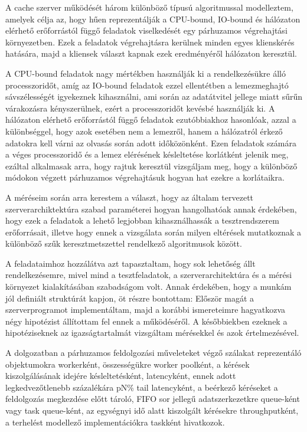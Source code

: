 \documentclass[11pt,a4paper]{article}
\begin{document}
A cache szerver működését három különböző típusú algoritmussal modelleztem, amelyek célja az, hogy hűen reprezentálják
a CPU-bound, IO-bound és hálózaton elérhető erőforrástól függő feladatok viselkedését egy párhuzamos végrehajtási környezetben.
Ezek a feladatok végrehajtásra kerülnek minden egyes klienskérés hatására, majd a kliensek választ kapnak ezek eredményéről
hálózaton keresztül.

A CPU-bound feladatok nagy mértékben használják ki a rendelkezésükre álló processzoridőt, amíg az IO-bound feladatok ezzel ellentétben
a lemezmeghajtó sávszélességét igyekeznek kihasználni, ami során az adatátvitel jellege miatt sűrűn várakozásra kényszerülnek, ezért
a processzoridőt kevésbé használják ki. A hálózaton elérhető erőforrástól függő feladatok ezutóbbiakhoz hasonlóak, azzal a különbséggel,
hogy azok esetében nem a lemezről, hanem a hálózatról érkező adatokra kell várni az olvasás során adott időközönként.
Ezen feladatok számára a véges processzoridő és a lemez elérésének késleltetése korlátként jelenik meg, ezáltal alkalmasak arra,
hogy rajtuk keresztül vizsgáljam meg, hogy a különböző módokon végzett párhuzamos végrehajtásuk hogyan hat ezekre a korlátaikra.

A méréseim során arra kerestem a választ, hogy az általam tervezett szerverarchiktektúra szabad paraméterei hogyan hangolhatóak
annak érdekében, hogy ezek a feladatok a lehető legjobban kihasználhassák a tesztrendszerem erőforrásait, illetve hogy ennek
a vizsgálata során milyen eltérések mutatkoznak a különböző szűk keresztmetszettel rendelkező algoritmusok között.

A feladataimhoz hozzálátva azt tapasztaltam, hogy sok lehetőség állt rendelkezésemre, mivel mind a tesztfeladatok, a szerverarchitektúra és
a mérési környezet kialakításában szabadságom volt.
Annak érdekében, hogy a munkám jól definiált struktúrát kapjon, öt részre bontottam:
Először magát a szerverprogramot implementáltam, majd a korábbi ismereteimre hagyatkozva négy hipotézist állítottam fel
ennek a működéséről. A későbbiekben ezeknek a hipotéziseknek az igazságtartalmát vizsgáltam mérésekkel és azok értelmezésével.


A dolgozatban a párhuzamos feldolgozási műveleteket végző szálakat reprezentáló objektumokra workerként, összességükre worker poolként,
a kérések kiszolgálásának idejére késleltetésként, latencyként, ennek adott legkedvezőtlenebb százalékára pN\% tail latencyként,
a beérkező kéréseket a feldolgozás megkezdése előtt tároló, FIFO sor jellegű adatszerkezetkre queue-ként vagy task queue-ként, az egységnyi idő alatt
kiszolgált kérésekre throughputként, a terhelést modellező implementációkra taskként hivatkozok.
\end{document}
